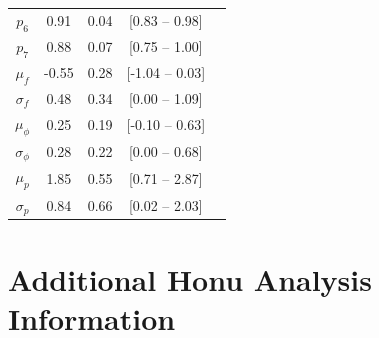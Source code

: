 \documentclass[11pt]{article}
\begin{document}
\begin{table}[h]
\begin{tabular}{ccccc}
         $p_6$ & 0.91 & 0.04 & [0.83 -- 0.98]   \\
         $p_7$ & 0.88 & 0.07 &  [0.75 -- 1.00]  \\
         \hline
         $\mu_f$        & -0.55 & 0.28 &  [-1.04 -- 0.03]  \\
         $\sigma_f $    & 0.48 & 0.34 &  [0.00 -- 1.09]  \\
         $\mu_\phi$     &  0.25 & 0.19 &  [-0.10 -- 0.63]  \\
         $\sigma_\phi $ & 0.28 & 0.22 &  [0.00 -- 0.68]  \\
         $\mu_p$        &  1.85 & 0.55 &  [0.71 -- 2.87]  \\
         $\sigma_p $    & 0.84 & 0.66 &  [0.02 -- 2.03]  \\
         \hline
    \end{tabular}
\end{table}

\clearpage

\section{Additional Honu Analysis Information}

\footnotesize
\end{document}
